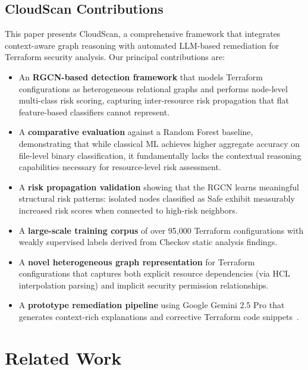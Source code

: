 \documentclass[conference]{IEEEtran}
\begin{document}
\subsection{CloudScan Contributions}

This paper presents CloudScan, a comprehensive framework that integrates context-aware graph reasoning with automated LLM-based remediation for Terraform security analysis. Our principal contributions are:

\begin{itemize}
    \item An \textbf{RGCN-based detection framework} that models Terraform configurations as heterogeneous relational graphs and performs node-level multi-class risk scoring, capturing inter-resource risk propagation that flat feature-based classifiers cannot represent.
    \item A \textbf{comparative evaluation} against a Random Forest baseline, demonstrating that while classical ML achieves higher aggregate accuracy on file-level binary classification, it fundamentally lacks the contextual reasoning capabilities necessary for resource-level risk assessment.
    \item A \textbf{risk propagation validation} showing that the RGCN learns meaningful structural risk patterns: isolated nodes classified as Safe exhibit measurably increased risk scores when connected to high-risk neighbors.
    \item A \textbf{large-scale training corpus} of over 95,000 Terraform configurations with weakly supervised labels derived from Checkov static analysis findings.
    \item A \textbf{novel heterogeneous graph representation} for Terraform configurations that captures both explicit resource dependencies (via HCL interpolation parsing) and implicit security permission relationships.
    \item A \textbf{prototype remediation pipeline} using Google Gemini 2.5 Pro that generates context-rich explanations and corrective Terraform code snippets~\cite{palavalli2024}.
\end{itemize}

\section{Related Work}
\end{document}
